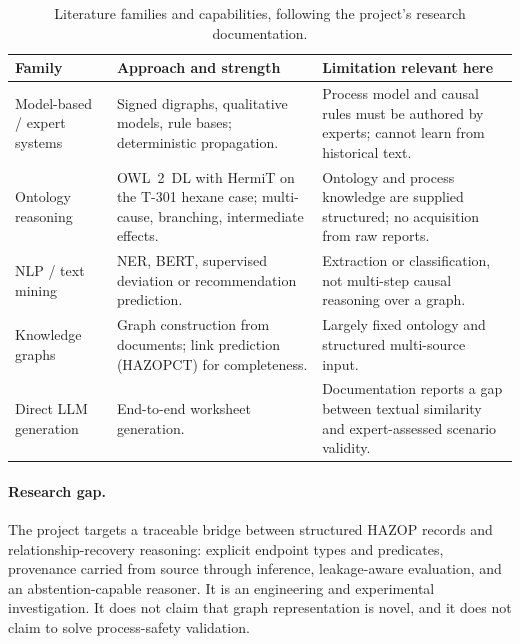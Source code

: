 \documentclass[10pt,twocolumn,a4paper]{extarticle}
\begin{document}
\begin{table}[t]
\centering
\caption{Literature families and capabilities, following the project's research documentation.}
\label{tab:lit}
\begin{tabularx}{\textwidth}{@{}>{\raggedright\arraybackslash}p{4.4cm}>{\raggedright\arraybackslash}X>{\raggedright\arraybackslash}X@{}}
\toprule
\textbf{Family} & \textbf{Approach and strength} & \textbf{Limitation relevant here}\\
\midrule
Model-based / expert systems \cite{vaid1995,vaid1996,rahman2009,rodriguez2012} & Signed digraphs, qualitative models, rule bases; deterministic propagation. & Process model and causal rules must be authored by experts; cannot learn from historical text.\\
Ontology reasoning \cite{single2020} & OWL~2~DL with HermiT on the T-301 hexane case; multi-cause, branching, intermediate effects. & Ontology and process knowledge are supplied structured; no acquisition from raw reports.\\
NLP / text mining \cite{feng2021,wang2021,wanggu2022,ekra2023,ekra2024} & NER, BERT, supervised deviation or recommendation prediction. & Extraction or classification, not multi-step causal reasoning over a graph.\\
Knowledge graphs \cite{mao2020,li2024,li2025} & Graph construction from documents; link prediction (HAZOPCT) for completeness. & Largely fixed ontology and structured multi-source input.\\
Direct LLM generation \cite{lee2026} & End-to-end worksheet generation. & Documentation reports a gap between textual similarity and expert-assessed scenario validity.\\
\bottomrule
\end{tabularx}
\end{table}

\paragraph{Research gap.} The project targets a traceable bridge between structured HAZOP records and relationship-recovery reasoning: explicit endpoint types and predicates, provenance carried from source through inference, leakage-aware evaluation, and an abstention-capable reasoner. It is an engineering and experimental investigation. It does not claim that graph representation is novel, and it does not claim to solve process-safety validation.

\end{document}
